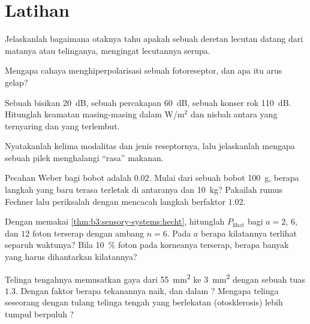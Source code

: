 \section{Latihan}

\begin{exercise}[$\star$]\label{exo:b3:sensory-systems:1}
Jelaskanlah bagaimana otaknya tahu apakah sebuah deretan lecutan datang dari
matanya atau telinganya, mengingat lecutannya serupa.
\end{exercise}

\begin{exercise}[$\star$]\label{exo:b3:sensory-systems:2}
Mengapa cahaya menghiperpolarisasi sebuah fotoreseptor, dan apa itu arus
gelap?
\end{exercise}

\begin{exercise}[$\star$]\label{exo:b3:sensory-systems:3}
Sebuah bisikan \qty{20}{dB}, sebuah percakapan \qty{60}{dB}, sebuah konser rok
\qty{110}{dB}. Hitunglah keamatan masing-masing dalam W/m$^{2}$ dan
nisbah antara yang ternyaring dan yang terlembut.
\end{exercise}

\begin{exercise}[$\star$]\label{exo:b3:sensory-systems:4}
Nyatakanlah kelima modalitas  dan jenis reseptornya, lalu jelaskanlah
mengapa sebuah pilek menghalangi ``rasa'' makanan.
\end{exercise}

\begin{exercise}[$\star\star$]\label{exo:b3:sensory-systems:5}
Pecahan Weber bagi bobot adalah $0.02$. Mulai dari sebuah bobot
\qty{100}{g}, berapa langkah yang baru terasa terletak di antaranya dan
\qty{10}{kg}? Pakailah rumus Fechner lalu periksalah dengan mencacah langkah
berfaktor $1.02$.
\end{exercise}

\begin{exercise}[$\star\star$]\label{exo:b3:sensory-systems:6}
Dengan memakai \cref{thm:b3:sensory-systems:hecht}, hitunglah $P_{\text{lihat}}$ bagi
$a = 2$, $6$, dan $12$ foton terserap dengan ambang $n = 6$.
Pada $a$ berapa kilatannya terlihat separuh waktunya? Bila \qty{10}{\%} foton
pada korneanya terserap, berapa banyak yang harus dihantarkan kilatannya?
\end{exercise}

\begin{exercise}[$\star\star$]\label{exo:b3:sensory-systems:7}
Telinga tengahnya memusatkan gaya dari \qty{55}{mm^2} ke
\qty{3}{mm^2} dengan sebuah tuas $1.3$. Dengan faktor berapa tekanannya
naik, dan dalam ? Mengapa telinga seseorang dengan tulang
telinga tengah yang berlekatan (otosklerosis) lebih tumpul berpuluh ?
\end{exercise}

